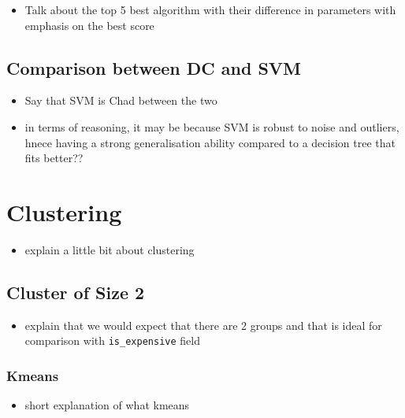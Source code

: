 \documentclass[11pt]{article}
\providecommand{\tightlist}{%
      \setlength{\itemsep}{0pt}\setlength{\parskip}{0pt}}
\begin{document}
    \begin{itemize}
\tightlist
\item
  Talk about the top 5 best algorithm with their difference in
  parameters with emphasis on the best score
\end{itemize}

    \hypertarget{comparison-between-dc-and-svm}{%
\subsection{Comparison between DC and
SVM}\label{comparison-between-dc-and-svm}}

\begin{itemize}
\tightlist
\item
  Say that SVM is Chad between the two
\item
  in terms of reasoning, it may be because SVM is robust to noise and
  outliers, hnece having a strong generalisation ability compared to a
  decision tree that fits better??
\end{itemize}

    \hypertarget{clustering}{%
\section{Clustering}\label{clustering}}

\begin{itemize}
\tightlist
\item
  explain a little bit about clustering
\end{itemize}

    \hypertarget{cluster-of-size-2}{%
\subsection{Cluster of Size 2}\label{cluster-of-size-2}}

\begin{itemize}
\tightlist
\item
  explain that we would expect that there are 2 groups and that is ideal
  for comparison with \texttt{is\_expensive} field
\end{itemize}

\hypertarget{kmeans}{%
\subsubsection{Kmeans}\label{kmeans}}

\begin{itemize}
\tightlist
\item
  short explanation of what kmeans
\end{itemize}
\end{document}

